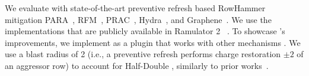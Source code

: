 We evaluate \X{} with  state-of-the-art preventive refresh based RowHammer mitigation 
PARA~\cite{kim2014flipping}, 
RFM~\cite{jedec2020ddr5}, 
PRAC~\cite{jedec2024ddr5}, 
Hydra~\cite{qureshi2022hydra}, and 
Graphene~\cite{park2020graphene}.
We use the implementations that are publicly available in  Ramulator 2 ~\cite{ramulator2github}. To showcase \X's improvements, we implement \X{} as a plugin that works with other mechanisms .
We use a blast radius of 2 (i.e., a preventive refresh performs charge restoration  $\pm2$ of an aggressor row) to account for  Half-Double , similarly to prior works~\cite{olgun2024abacus, canpolat2024prac, qureshi2024mint, qureshi2024impress, hassan2021utrr, yaglikci2021blockhammer, canpolat2024breakhammer}.

